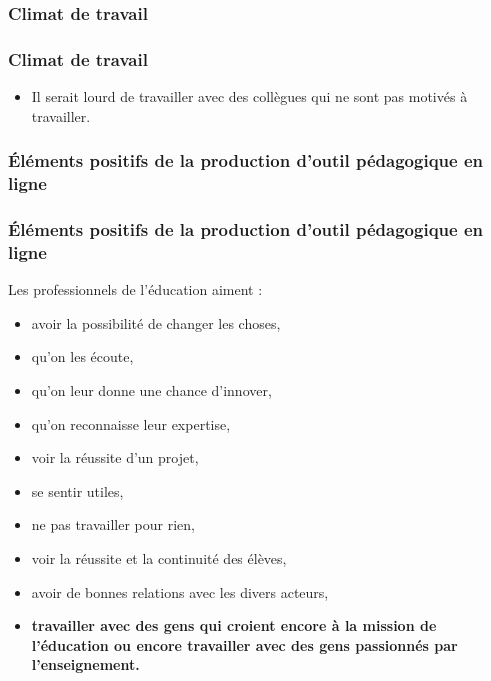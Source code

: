 					\subsubsection{Climat de travail} 
						\begin{frame}[allowframebreaks]
						\frametitle{Climat de travail}
                        			
                        			\begin{itemize}
                        			\item Il serait lourd de travailler avec des collègues qui ne sont pas motivés à travailler.
                        				
						\end{itemize}
						\end{frame}		
						
					\subsubsection{Éléments positifs de la production d’outil pédagogique en ligne} 
						\begin{frame}[allowframebreaks]
						\frametitle{Éléments positifs de la production d’outil pédagogique en ligne}
                        			Les professionnels de l'éducation aiment : 
                        			\begin{itemize}
                        			\item avoir la possibilité de changer les choses,
                        			\item qu’on les écoute,
                        			\item qu’on leur donne une chance d’innover, 
                        			\item qu’on reconnaisse leur expertise, 
                        			\item voir la réussite d’un projet, 
                        			\item se sentir utiles, 
                        			\item ne pas travailler pour rien, 
                        			\item voir la réussite et la continuité des élèves,
                        			\item avoir de bonnes relations avec les divers acteurs,
                        			\item \textbf{travailler avec des gens qui croient encore à la mission de l’éducation ou encore travailler avec des gens passionnés par l’enseignement.}
                        				
						\end{itemize}
						\end{frame}		
						
